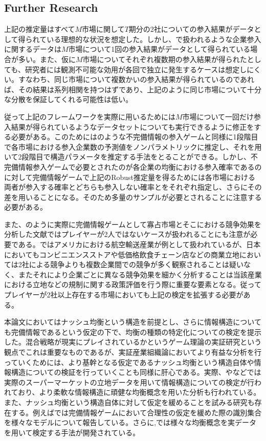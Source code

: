 \documentclass{jsarticle}
\begin{document}
\subsection{Further Research}
上記の推定量はすべて$M$市場に関して$T$期分の2社についての参入結果がデータとして得られている理想的な状況を想定した。しかし、\cite{Ciliberto2009a}で扱われるような企業参入に関するデータは$M$市場について1回の参入結果がデータとして得られている場合が多い。また、仮に$M$市場についてそれぞれ複数期の参入結果が得られたとしても、研究者には観測不可能な効用が各回で独立に発生するケースは想定しにくい。すなわち、同じ市場について複数かいの参入結果が得られているのであれば、その結果は系列相関を持つはずであり、上記のように同じ市場について十分な分散を保証してくれる可能性は低い。

従って上記のフレームワークを実際に用いるためには$ M$市場について一回だけ参入結果が得られているようなデータセットについても実行できるように修正をする必要がある。このためには\cite{Seim2006}のような不完備情報の参入ゲームと同様に1段階目で各市場における参入企業数の予測値をノンパラメトリックに推定し、それを用いて2段階目で構造パラメータを推定する手法をとることができる。しかし、不完備情報参入ゲームで必要とされたのが各企業の均衡における参入確率であるのに対して完備情報ゲームで上記のRobust推定量を得るためには各市場における両者が参入する確率とどちらも参入しない確率とをそれぞれ指定し、さらにその差を用いることになる。そのため多量のサンプルが必要とされることに注意する必要がある。

また、\cite{Ciliberto2009a}のように実際に完備情報ゲームとして寡占市場とそこにおける競争効果を分析した文献ではプレイヤーが2人ではないケースが扱われることにも注意が必要である。\cite{Ciliberto2009a}ではアメリカにおける航空輸送産業が例として扱われているが、日本においてもコンビニエンスストアや低価格飲食チェーン店などの商業立地においては2社による競争よりも複数企業間での競争が多く観察されることは疑いなく、またそれにより企業ごとに異なる競争効果を細かく分析することは当該産業における立地などの規制に関する政策評価を行う際に重要な要素となる。従ってプレイヤーが2社以上存在する市場においても上記の検定を拡張する必要がある。

本論文においてはナッシュ均衡という構造を前提とし、さらに情報構造についても完備情報であるという仮定の下で、均衡の種類の特定化についての検定を提示した。混合戦略が現実にプレイされているかというゲーム理論の実証研究という観点でこれは重要なものであるが、実証産業組織論においてより有益な分析を行っていくためには、より基幹となる仮定であるナッシュ均衡という構造自体や情報構造についての検証を行っていくことも同様に肝心である。実際、\cite{Grieco2014a}や\cite{Magnolfi2015}などでは実際のスーパーマーケットの立地データを用いて情報構造についての検定が行われており、より柔軟な情報構造に頑健な均衡概念を用いた分析も行われている。また、ナッシュ均衡という構造自体に対して仮定を緩めることを試みる研究も存在する。例えば\cite{Aradillas-Lopez2008}では完備情報ゲームにおいて合理性の仮定を緩めた際の識別集合を様々なモデルについて報告している。さらに\cite{Kashaev2017},\cite{Kashaev2016}では様々な均衡概念を実データを用いて検定する手法が開発されている。
\end{document}

